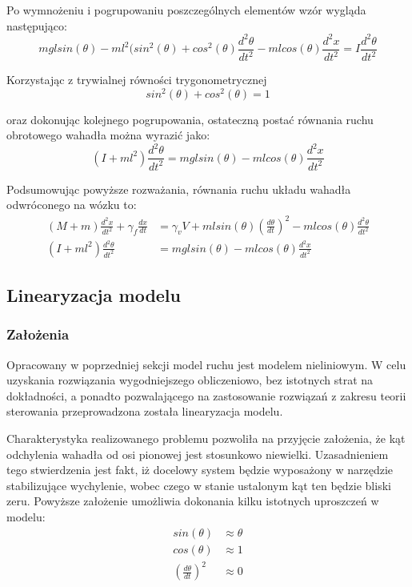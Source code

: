 \documentclass[12pt, oneside]{report}
\theoremstyle{definition}
\begin{document}
Po wymnożeniu i pogrupowaniu poszczególnych elementów wzór wygląda następująco:
\begin{equation}
mglsin(\theta) - ml^2(sin^2(\theta) + cos^2(\theta) \frac{d^2\theta}{dt^2} - mlcos(\theta) \frac{d^2x}{dt^2} = I\frac{d^2\theta}{dt^2}
\end{equation}

Korzystając z trywialnej równości trygonometrycznej
\begin{equation}
sin^2(\theta) + cos^2(\theta) = 1
\end{equation}

oraz dokonując kolejnego pogrupowania, ostateczną postać równania ruchu obrotowego wahadła można wyrazić jako:
\begin{equation}
(I + ml^2)\frac{d^2\theta}{dt^2} = mglsin(\theta) - mlcos(\theta)\frac{d^2x}{dt^2}
\end{equation}

Podsumowując powyższe rozważania, równania ruchu układu wahadła odwróconego na wózku to:
\begin{equation} \label{Equations}
\begin{aligned}
(M + m) \frac{d^2x}{dt^2} + \gamma_f \frac{dx}{dt} &= \gamma_v V + mlsin(\theta)(\frac{d\theta}{dt})^2 - mlcos(\theta) \frac{d^2\theta}{dt^2}\\
(I + ml^2)\frac{d^2\theta}{dt^2} &= mglsin(\theta) - mlcos(\theta)\frac{d^2x}{dt^2}
\end{aligned}
\end{equation}

\subsection{Linearyzacja modelu}
\subsubsection{Założenia}
Opracowany w poprzedniej sekcji model ruchu jest modelem nieliniowym. W celu uzyskania rozwiązania wygodniejszego obliczeniowo, bez istotnych strat na dokładności, a ponadto pozwalającego na zastosowanie rozwiązań z zakresu teorii sterowania przeprowadzona została linearyzacja modelu. 

Charakterystyka realizowanego problemu pozwoliła na przyjęcie założenia, że kąt odchylenia wahadła od osi pionowej jest stosunkowo niewielki. Uzasadnieniem tego stwierdzenia jest fakt, iż docelowy system będzie wyposażony w narzędzie stabilizujące wychylenie, wobec czego w stanie ustalonym kąt ten będzie bliski zeru. Powyższe założenie umożliwia dokonania kilku istotnych uproszczeń w modelu:
\begin{equation}
\begin{aligned}
sin(\theta) &\approx \theta \\
cos(\theta) &\approx 1 \\
(\frac{d\theta}{dt})^2 &\approx 0
\end{aligned}
\end{equation}
\end{document}
